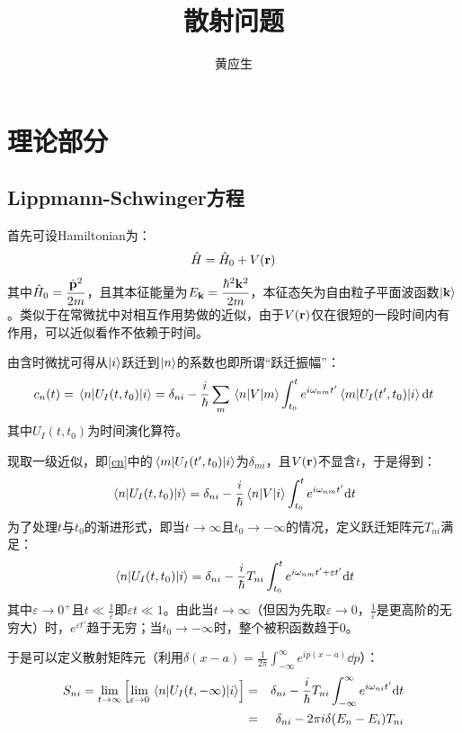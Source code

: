 \documentclass[hyperref]{ctexart}
\title{散射问题}
\author{黄应生}
\date{}
\begin{document}
\maketitle
\tableofcontents

\section{理论部分}
\subsection{Lippmann-Schwinger方程}
首先可设Hamiltonian为：
\begin{equation}\label{H}
  \hat{H}=\hat{H}_0+V(\vb{r})
\end{equation}
其中$\displaystyle\hat{H}_0=\frac{\hat{\vb{p}}^2}{2m}$，且其本征能量为$\displaystyle E_{\vb{k}}=\frac{\hbar^2\vb{k}^2}{2m}$，本征态矢为自由粒子平面波函数$\ket{\vb{k}}$。类似于在常微扰中对相互作用势做的近似，由于$V(\vb{r})$仅在很短的一段时间内有作用，可以近似看作不依赖于时间。

由含时微扰可得从$\ket{i}$跃迁到$\ket{n}$的系数也即所谓“跃迁振幅”：
\begin{equation}\label{cn}
  c_n(t)=\mel{n}{U_I(t,t_0)}{i}=\delta_{ni}-\frac{i}{\hbar}\sum_{m}\mel{n}{V}{m}\int_{t_0}^{t}e^{i\omega_{nm}t'}\mel{m}{U_I(t',t_0)}{i}\dd t
\end{equation}
其中$U_I(t,t_0)$为时间演化算符。

现取一级近似，即\eqref{cn}中的$\mel{m}{U_I(t',t_0)}{i}$为$\delta_{mi}$，且$V(\vb{r})$不显含$t$，于是得到：
\begin{equation}\label{1st order}
  \mel{n}{U_I(t,t_0)}{i}=\delta_{ni}-\frac{i}{\hbar}\mel{n}{V}{i}\int_{t_0}^{t}e^{i\omega_{nm}t'}\dd t
\end{equation}
为了处理$t$与$t_0$的渐进形式，即当$t\rightarrow\infty$且$t_0\rightarrow-\infty$的情况，定义跃迁矩阵元$T_{ni}$满足：
\begin{equation}\label{Tni}
  \mel{n}{U_I(t,t_0)}{i}=\delta_{ni}-\frac{i}{\hbar}T_{ni}\int_{t_0}^{t}e^{i\omega_{nm}t'+\varepsilon t'}\dd t
\end{equation}
其中$\varepsilon\rightarrow0^+$且$\displaystyle t\ll\frac{1}{\varepsilon}$即$\varepsilon t\ll 1$。由此当$t\rightarrow\infty$（但因为先取$\varepsilon\rightarrow0$，$\displaystyle\frac{1}{\varepsilon}$是更高阶的无穷大）时，$e^{\varepsilon t'}$趋于无穷；当$t_0\rightarrow-\infty$时，整个被积函数趋于0。

于是可以定义散射矩阵元（利用$\displaystyle\delta(x-a)=\frac{1}{2\pi}\int_{-\infty}^{\infty}e^{ip(x-a)}\dd p$）：
\begin{eqnarray}\label{Sni}
  S_{ni}=\lim_{t\rightarrow\infty}\bqty{\lim_{\varepsilon\rightarrow0}\mel{n}{U_I(t,-\infty)}{i}}&=&\delta_{ni}-\frac{i}{\hbar}T_{ni}\int_{-\infty}^{\infty}e^{i\omega_{ni}t'}\dd t\\
  &=&\delta_{ni}-2\pi i \delta(E_n-E_i)T_{ni}
\end{eqnarray}
\end{document}
